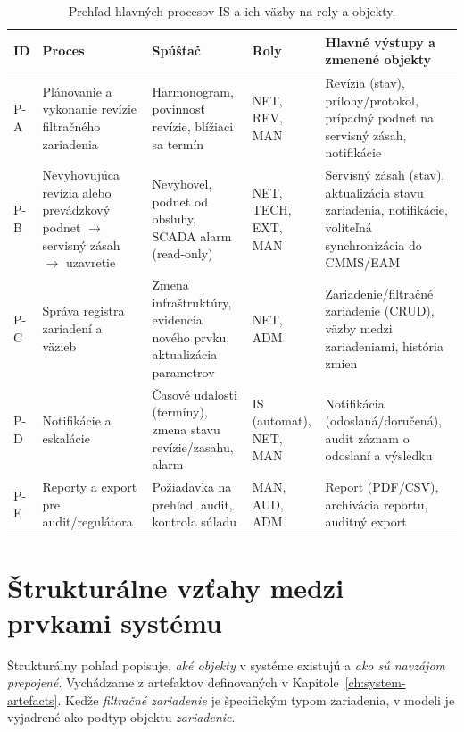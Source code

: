 \begin{table}[!htbp]
\centering
\small
\setlength{\tabcolsep}{3pt}
\renewcommand{\arraystretch}{1.2}
\begin{tabularx}{\textwidth}{>{\raggedright\arraybackslash}p{12mm} >{\raggedright\arraybackslash}X >{\raggedright\arraybackslash}p{31mm} >{\raggedright\arraybackslash}p{22mm} >{\raggedright\arraybackslash}X}
\toprule
\textbf{ID} & \textbf{Proces} & \textbf{Spúšťač} & \textbf{Roly} & \textbf{Hlavné výstupy a zmenené objekty} \\
\midrule
P-A & Plánovanie a vykonanie revízie filtračného zariadenia & Harmonogram, povinnosť revízie, blížiaci sa termín & NET, REV, MAN & Revízia (stav), prílohy/protokol, prípadný podnet na servisný zásah, notifikácie \\
\midrule
P-B & Nevyhovujúca revízia alebo prevádzkový podnet $\rightarrow$ servisný zásah $\rightarrow$ uzavretie & Nevyhovel, podnet od obsluhy, SCADA alarm (read-only) & NET, TECH, EXT, MAN & Servisný zásah (stav), aktualizácia stavu zariadenia, notifikácie, voliteľná synchronizácia do CMMS/EAM \\
\midrule
P-C & Správa registra zariadení a väzieb & Zmena infraštruktúry, evidencia nového prvku, aktualizácia parametrov & NET, ADM & Zariadenie/filtračné zariadenie (CRUD), väzby medzi zariadeniami, história zmien \\
\midrule
P-D & Notifikácie a eskalácie & Časové udalosti (termíny), zmena stavu revízie/zasahu, alarm & IS (automat), NET, MAN & Notifikácia (odoslaná/doručená), audit záznam o odoslaní a výsledku \\
\midrule
P-E & Reporty a export pre audit/regulátora & Požiadavka na prehľad, audit, kontrola súladu & MAN, AUD, ADM & Report (PDF/CSV), archivácia reportu, auditný export \\
\bottomrule
\end{tabularx}
\caption{Prehľad hlavných procesov IS a ich väzby na roly a objekty.}
\label{tab:process-overview}
\end{table}

\section{Štrukturálne vzťahy medzi prvkami systému}
\label{sec:structural-relations}

Štrukturálny pohľad popisuje, \emph{aké objekty} v systéme existujú a \emph{ako sú navzájom prepojené}. Vychádzame z artefaktov definovaných v Kapitole~\ref{ch:system-artefacts}.
Keďže \emph{filtračné zariadenie} je špecifickým typom zariadenia, v modeli je vyjadrené ako podtyp objektu \emph{zariadenie}.

